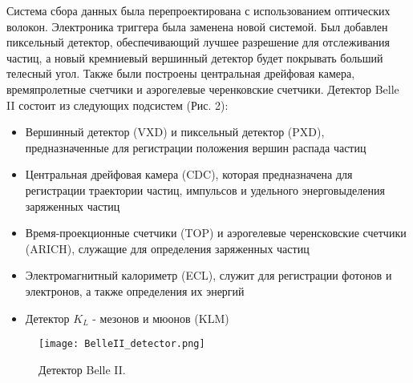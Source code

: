   Система сбора данных была перепроектирована с использованием оптических волокон. Электроника триггера была заменена новой системой. Был добавлен пиксельный детектор, обеспечивающий лучшее разрешение для отслеживания частиц, а новый кремниевый вершинный детектор будет покрывать больший телесный угол. Также были построены центральная дрейфовая камера, времяпролетные счетчики и аэрогелевые черенковские счетчики. Детектор Belle II состоит из следующих подсистем (Рис. 2)\cite{Detector}:
\begin{itemize}
  \item Вершинный детектор (VXD) и пиксельный детектор (PXD), предназначенные для регистрации положения вершин распада частиц
  \item Центральная дрейфовая камера (CDC), которая предназначена для регистрации траектории частиц, импульсов и удельного энерговыделения заряженных частиц
  \item Время-проекционные счетчики (TOP) и аэрогелевые черенсковские счетчики (ARICH), служащие для определения заряженных частиц
  \item Электромагнитный калориметр (ECL), служит для регистрации фотонов и электронов, а также определения их энергий
  \item Детектор $K_{L}$ - мезонов и мюонов (KLM)
\end{itemize}
\begin{figure}[htp]
  \centering
  \texttt{[image: BelleII\_detector.png]}
  \caption{Детектор Belle II.}
  \label{fig:galaxy}
\end{figure}
